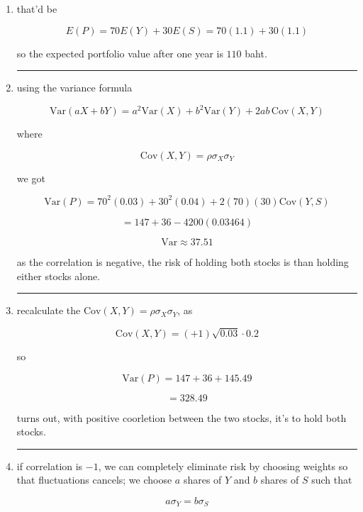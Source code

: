 \begin{enumerate}
\item that'd be

\[
E(P)=70E(Y)+30E(S)=70(1.1)+30(1.1)
\]

so the expected portfolio value after one year is $\boxed{110}$ baht.

\medskip
\begin{center}
\rule{0.3\linewidth}{0.2pt}
\end{center}
\medskip

\item using the variance formula

\[
\mathrm{Var}(aX+bY)=a^2\mathrm{Var}(X)+b^2\mathrm{Var}(Y)+2ab\,\mathrm{Cov}(X,Y)
\]

where

\[
\mathrm{Cov}(X,Y)=\rho\sigma_X\sigma_Y
\]

we got

\[
\mathrm{Var}(P)=70^2(0.03)+30^2(0.04)+2(70)(30)\mathrm{Cov}(Y,S)
\]

\[
=147+36-4200(0.03464)
\]

\[
\mathrm{Var} \approx\boxed{37.51}
\]

as the correlation is negative, the risk of holding both stocks is  than holding either stocks alone. 

\medskip
\begin{center}
\rule{0.3\linewidth}{0.2pt}
\end{center}
\medskip

\item recalculate the $\mathrm{Cov}(X,Y)=\rho\sigma_X\sigma_Y$, as

\[
\mathrm{Cov}(X,Y)=(+1)\sqrt{0.03}\cdot0.2
\]

so

\[
\mathrm{Var}(P)=147+36+145.49
\]

\[
=\boxed{328.49}
\]

turns out, with positive coorletion between the two stocks, it's  to hold both stocks. 

\medskip
\begin{center}
\rule{0.3\linewidth}{0.2pt}
\end{center}
\medskip

\item if correlation is $-1$, we can completely eliminate risk by choosing weights so that fluctuations cancels; we choose $a$ shares of $Y$ and $b$ shares of $S$ such that

\[
a\sigma_Y=b\sigma_S
\]


\end{enumerate}
